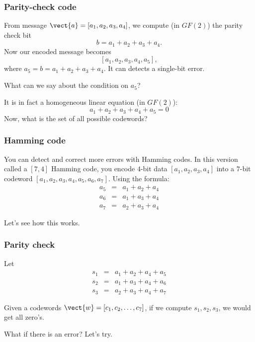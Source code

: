 \begin{frame}
  \frametitle{Parity-check code}

  \pause

  From message $\vect{a}=[a_1,a_2,a_3,a_4]$, we compute (in $GF(2)$)
  the parity check bit
  \[
  b = a_1 + a_2 + a_3 + a_4.
  \]
  \pause
  Now our encoded message becomes
  \[
  [a_1,a_2,a_3,a_4,a_5],
  \]
  where $a_5=b=a_1 + a_2 + a_3 + a_4$.  It can detects a single-bit
  error.
  \pause

  \vspace{0.2in}

  What can we say about the condition on $a_5$? \pause

  It is in fact a homogeneous linear equation (in $GF(2)$):
  \[
  a_1 + a_2 + a_3 + a_4+a_5 = 0
  \]
  \pause
  \vspace{0.1in}
  Now, what is the set of all possible codewords?
\end{frame}

\begin{frame}
  \frametitle{Hamming code}

  You can detect and correct more errors with Hamming codes.  In this
  version called a $[7,4]$ Hamming code, you encode $4$-bit data
  $[a_1,a_2,a_3,a_4]$ into a $7$-bit codeword
  $[a_1,a_2,a_3,a_4,a_5,a_6,a_7]$.  Using the formula:
  \[
  \begin{array}{rcl}
    a_5 &=& a_1 + a_2 + a_4\\
    a_6 &=& a_1 + a_3 + a_4\\
    a_7 &=& a_2 + a_3 + a_4
  \end{array}
  \]
  \pause

  Let's see how this works.

  \vspace{1.5in}
  
\end{frame}

\begin{frame}
  \frametitle{Parity check}
  Let
  \[
  \begin{array}{rcl}
    s_1 &=& a_1 + a_2 + a_4 + a_5\\
    s_2 &=& a_1 + a_3 + a_4 + a_6\\
    s_3 &=& a_2 + a_3 + a_4 + a_7
  \end{array}
  \]

  Given a codewords $\vect{w}=[c_1,c_2,\ldots,c_7]$, if we compute
  $s_1,s_2,s_3$, we would get all zero's.

  \pause

  What if there is an error?  Let's try.
  \vspace{1.5in}
\end{frame}

